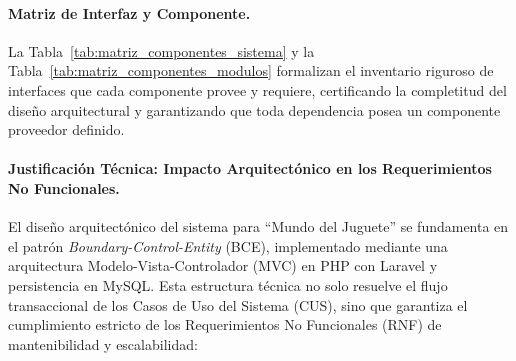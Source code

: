 \documentclass[12pt,a4paper]{article}
\begin{document}
\paragraph{Matriz de Interfaz y Componente.}
La Tabla~\ref{tab:matriz_componentes_sistema} y la Tabla~\ref{tab:matriz_componentes_modulos} formalizan el inventario riguroso de interfaces que cada componente provee y requiere, certificando la completitud del diseño arquitectural y garantizando que toda dependencia posea un componente proveedor definido.



\paragraph{Justificación Técnica: Impacto Arquitectónico en los Requerimientos No Funcionales.}
El diseño arquitectónico del sistema para ``Mundo del Juguete'' se fundamenta en el patrón \emph{Boundary-Control-Entity} (BCE), implementado mediante una arquitectura Modelo-Vista-Controlador (MVC) en PHP con Laravel y persistencia en MySQL. Esta estructura técnica no solo resuelve el flujo transaccional de los Casos de Uso del Sistema (CUS), sino que garantiza el cumplimiento estricto de los Requerimientos No Funcionales (RNF) de mantenibilidad y escalabilidad:
\end{document}
